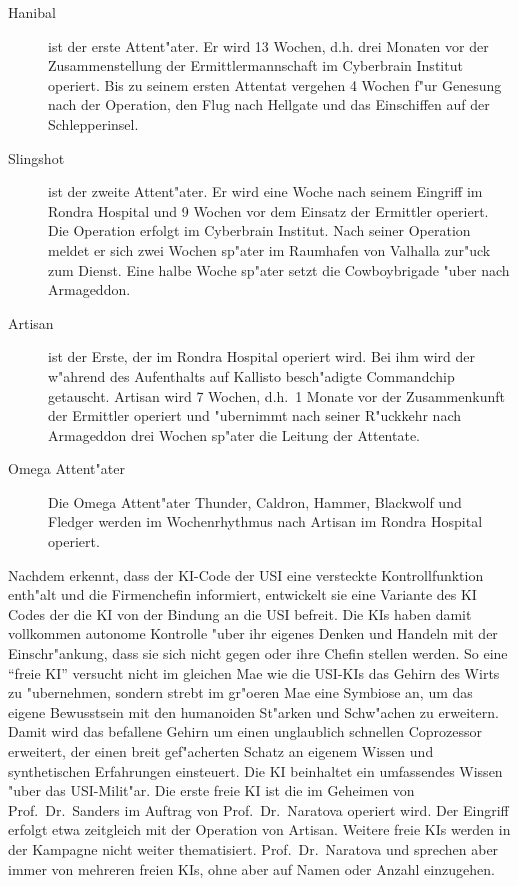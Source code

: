 \begin{description}
    \item[Hanibal] ist der erste Attent"ater. Er wird 13 Wochen, d.h. drei Monaten vor der Zusammenstellung der Ermittlermannschaft im 
        Cyberbrain Institut operiert. Bis zu seinem ersten Attentat vergehen 4 Wochen f"ur Genesung nach der Operation, den Flug nach Hellgate und das Einschiffen auf der Schlepperinsel.
    \item[Slingshot] ist der zweite Attent"ater. Er wird eine Woche nach seinem Eingriff im Rondra Hospital und 9 Wochen vor dem Einsatz 
        der Ermittler operiert. Die Operation erfolgt im Cyberbrain Institut. Nach seiner Operation meldet er sich zwei Wochen sp"ater im Raumhafen von Valhalla zur"uck zum Dienst. Eine halbe Woche sp"ater setzt die Cowboybrigade "uber nach Armageddon.
    \item[Artisan] ist der Erste, der im Rondra Hospital operiert wird. Bei ihm wird der w"ahrend des Aufenthalts auf Kallisto 
        besch"adigte Commandchip getauscht. Artisan wird 7 Wochen, d.h.~1 Monate vor der Zusammenkunft der Ermittler operiert und "ubernimmt nach seiner R"uckkehr nach Armageddon drei Wochen sp"ater die Leitung der Attentate.
    \item[Omega Attent"ater] Die Omega Attent"ater Thunder, Caldron, Hammer, Blackwolf und Fledger werden im Wochenrhythmus nach Artisan im 
        Rondra Hospital operiert.
\end{description}

Nachdem \ml{} erkennt, dass der KI-Code der USI eine versteckte Kontrollfunktion enth"alt und die Firmenchefin informiert, entwickelt sie eine Variante des KI Codes der die KI von der Bindung an die USI befreit. Die KIs haben damit vollkommen autonome Kontrolle "uber ihr eigenes Denken und Handeln mit der Einschr"ankung, dass sie sich nicht gegen \ml{} oder ihre Chefin stellen werden. So eine "`freie KI"' versucht nicht im gleichen Ma\3e wie die USI-KIs das Gehirn des Wirts zu "ubernehmen, sondern strebt im gr"o\3eren Ma\3e eine Symbiose an, um das eigene Bewusstsein mit den humanoiden St"arken und Schw"achen zu erweitern. Damit wird das befallene Gehirn um einen unglaublich schnellen Coprozessor erweitert, der einen breit gef"acherten Schatz an eigenem Wissen und synthetischen Erfahrungen einsteuert. Die KI beinhaltet ein umfassendes Wissen "uber das USI-Milit"ar. Die erste freie KI ist \xl{} die im Geheimen von Prof.~Dr.~Sanders im Auftrag von Prof.~Dr.~Naratova operiert wird. Der Eingriff erfolgt etwa zeitgleich mit der Operation von Artisan. Weitere freie KIs werden in der Kampagne nicht weiter thematisiert. Prof.~Dr.~Naratova und \ml{} sprechen aber immer von mehreren freien KIs, ohne aber auf Namen oder Anzahl einzugehen.
